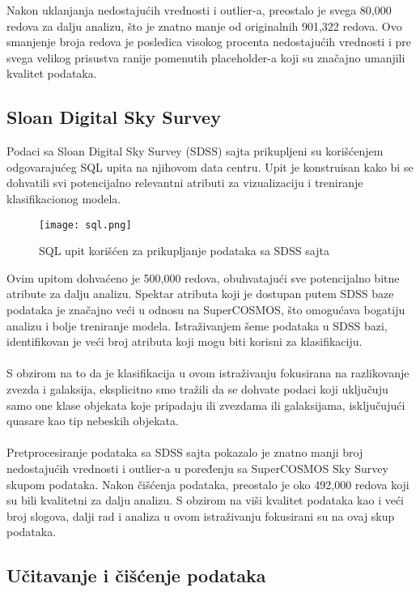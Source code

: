 \documentclass[a4paper,12pt]{article}
\begin{document}
Nakon uklanjanja nedostajućih vrednosti i outlier-a, preostalo je svega 80,000 redova za dalju analizu, što je znatno manje od originalnih 901,322 redova. Ovo smanjenje broja redova je posledica visokog procenta nedostajućih vrednosti i pre svega velikog prisustva ranije pomenutih placeholder-a koji su značajno umanjili kvalitet podataka.

\subsection{Sloan Digital Sky Survey}
Podaci sa Sloan Digital Sky Survey (SDSS) sajta prikupljeni su korišćenjem odgovarajućeg SQL upita na njihovom data centru. Upit je konstruisan kako bi se dohvatili svi potencijalno relevantni atributi za vizualizaciju i treniranje klasifikacionog modela.

\begin{figure}[h!]
\centering
\texttt{[image: sql.png]}
\caption{SQL upit korišćen za prikupljanje podataka sa SDSS sajta}
\label{fig:sql_query}
\end{figure}

Ovim upitom dohvaćeno je 500,000 redova, obuhvatajući sve potencijalno bitne atribute za dalju analizu. Spektar atributa koji je dostupan putem SDSS baze podataka je značajno veći u odnosu na SuperCOSMOS, što omogućava bogatiju analizu i bolje treniranje modela. Istraživanjem šeme podataka u SDSS bazi, identifikovan je veći broj atributa koji mogu biti korisni za klasifikaciju.\\\\
S obzirom na to da je klasifikacija u ovom istraživanju fokusirana na razlikovanje zvezda i galaksija, eksplicitno smo tražili da se dohvate podaci koji uključuju samo one klase objekata koje pripadaju ili zvezdama ili galaksijama, isključujući quasare kao tip nebeskih objekata.\\\\
Pretprocesiranje podataka sa SDSS sajta pokazalo je znatno manji broj nedostajućih vrednosti i outlier-a u poređenju sa SuperCOSMOS Sky Survey skupom podataka. Nakon čišćenja podataka, preostalo je oko 492,000 redova koji su bili kvalitetni za dalju analizu. S obzirom na viši kvalitet podataka kao i veći broj slogova, dalji rad i analiza u ovom istraživanju fokusirani su na ovaj skup podataka.

\subsection{Učitavanje i čišćenje podataka}
\end{document}
